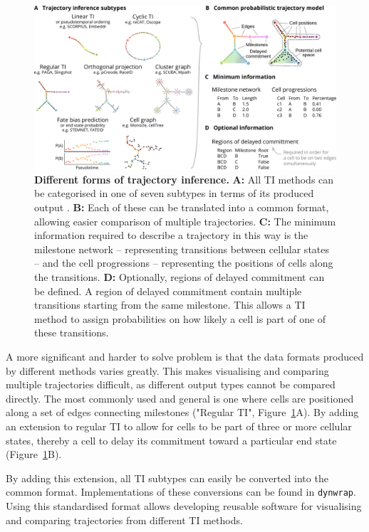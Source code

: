 \begin{figure}[htb!]
	\centering
	\includegraphics[width=\linewidth]{fig/method_types.pdf} 
	\caption{
		\textbf{Different forms of trajectory inference.}
		\textbf{A:} All TI methods can be categorised in one of seven subtypes in terms of its produced output \cite{saelens_comparisonsinglecelltrajectory_2019}.
		\textbf{B:} Each of these can be translated into a common format, allowing easier comparison of multiple trajectories.
		\textbf{C:} The minimum information required to describe a trajectory in this way is the milestone network -- representing transitions between cellular states -- and the cell progressions -- representing the positions of cells along the transitions.
		\textbf{D:} Optionally, regions of delayed commitment can be defined. A region of delayed commitment contain multiple transitions starting from the same milestone. This allows a TI method to assign probabilities on how likely a cell is part of one of these transitions.
	}
	\label{fig:method_types}
\end{figure}

A more significant and harder to solve problem is that the data formats produced by different methods varies greatly. This makes visualising and comparing multiple trajectories difficult, as different output types cannot be compared directly. The most commonly used and general is one where cells are positioned along a set of edges connecting milestones ("Regular TI", Figure~\ref{fig:method_types}A). 
By adding an extension to regular TI to allow for cells to be part of three or more cellular states, thereby a cell to delay its commitment toward a particular end state (Figure~\ref{fig:method_types}B). 

By adding this extension, all TI subtypes can easily be converted into the common format. Implementations of these conversions can be found in \texttt{dynwrap}\cite{dyno}. Using this standardised format allows developing reusable software for visualising and comparing trajectories from different TI methods.


